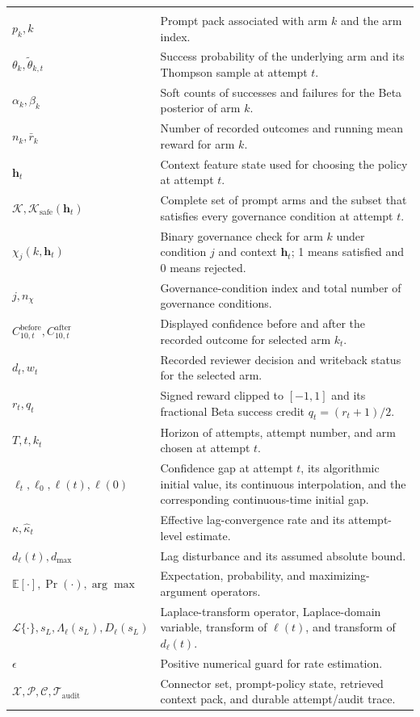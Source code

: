 \begin{longtable}{@{}>{\raggedright\arraybackslash}p{}>{\raggedright\arraybackslash}p{}@{}}
\addlinespace[2pt]
\multicolumn{2}{@{}l}{\textbf{Prompt policy, reward, and convergence}}\\
$p_k,k$ & Prompt pack associated with arm $k$ and the arm index. \\
$\theta_k,\widetilde\theta_{k,t}$ & Success probability of the underlying arm and its Thompson sample at attempt $t$. \\
$\alpha_k,\beta_k$ & Soft counts of successes and failures for the Beta posterior of arm $k$. \\
$n_k,\bar r_k$ & Number of recorded outcomes and running mean reward for arm $k$. \\
$\mathbf{h}_t$ & Context feature state used for choosing the policy at attempt $t$. \\
$\mathcal{K},\mathcal{K}_{\mathrm{safe}}(\mathbf{h}_t)$ & Complete set of prompt arms and the subset that satisfies every governance condition at attempt $t$. \\
$\chi_j(k,\mathbf{h}_t)$ & Binary governance check for arm $k$ under condition $j$ and context $\mathbf{h}_t$; 1 means satisfied and 0 means rejected. \\
$j,n_{\chi}$ & Governance-condition index and total number of governance conditions. \\
$C^{\mathrm{before}}_{10,t},C^{\mathrm{after}}_{10,t}$ & Displayed confidence before and after the recorded outcome for selected arm $k_t$. \\
$d_t,w_t$ & Recorded reviewer decision and writeback status for the selected arm. \\
$r_t,q_t$ & Signed reward clipped to $[-1,1]$ and its fractional Beta success credit $q_t=(r_t+1)/2$. \\
$T,t,k_t$ & Horizon of attempts, attempt number, and arm chosen at attempt $t$. \\
$\ell_t,\ell_0,\ell(t),\ell(0)$ & Confidence gap at attempt $t$, its algorithmic initial value, its continuous interpolation, and the corresponding continuous-time initial gap. \\
$\kappa,\widehat\kappa_t$ & Effective lag-convergence rate and its attempt-level estimate. \\
$d_{\ell}(t),d_{\max}$ & Lag disturbance and its assumed absolute bound. \\
$\mathbb{E}[\cdot],\Pr(\cdot),\arg\max$ & Expectation, probability, and maximizing-argument operators. \\
$\mathcal{L}\{\cdot\},s_L,\Lambda_{\ell}(s_L),D_{\ell}(s_L)$ & Laplace-transform operator, Laplace-domain variable, transform of $\ell(t)$, and transform of $d_{\ell}(t)$. \\
$\epsilon$ & Positive numerical guard for rate estimation. \\
$\mathcal{X},\mathcal{P},\mathcal{C},\mathcal{T}_{\mathrm{audit}}$ & Connector set, prompt-policy state, retrieved context pack, and durable attempt/audit trace. \\


\end{longtable}
